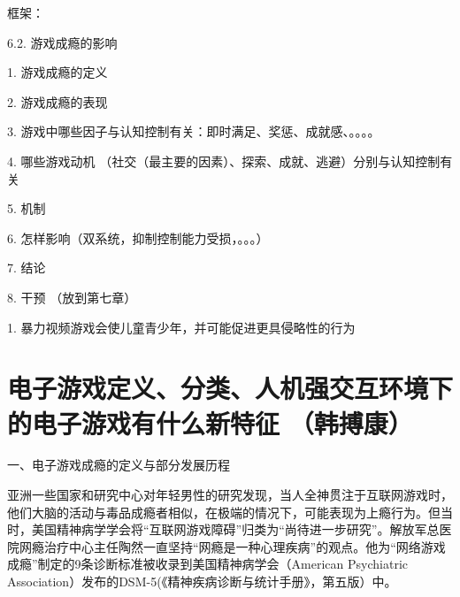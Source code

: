 \color{violet}


框架：

6.2. 游戏成瘾的影响

1. 游戏成瘾的定义

2. 游戏成瘾的表现

3. 游戏中哪些因子与认知控制有关：即时满足、奖惩、成就感、。。。。

4. 哪些游戏动机 （社交（最主要的因素）、探索、成就、逃避）分别与认知控制有关

5. 机制

6. 怎样影响（双系统，抑制控制能力受损，。。。）

7. 结论

8. 干预 （放到第七章）



1.  暴力视频游戏会使儿童青少年，并可能促进更具侵略性的行为




 
\section{电子游戏定义、分类、人机强交互环境下的电子游戏有什么新特征  
（韩搏康）
}

一、电子游戏成瘾的定义与部分发展历程 

亚洲一些国家和研究中心对年轻男性的研究发现，当人全神贯注于互联网游戏时，他们大脑的活动与毒品成瘾者相似，在极端的情况下，可能表现为上瘾行为。但当时，美国精神病学学会将“互联网游戏障碍”归类为“尚待进一步研究”。解放军总医院网瘾治疗中心主任陶然一直坚持“网瘾是一种心理疾病”的观点。他为“网络游戏成瘾”制定的9条诊断标准被收录到美国精神病学会（American Psychiatric Association）发布的DSM-5(《精神疾病诊断与统计手册》，第五版）中。

